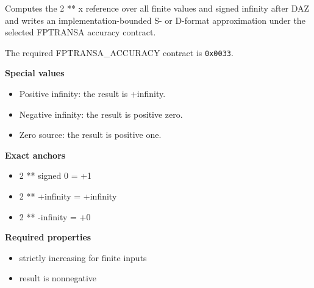 Computes the 2 ** x reference over all finite values and signed infinity after DAZ and writes an implementation-bounded S- or D-format approximation under the selected FPTRANSA accuracy contract.

The required FPTRANSA\_ACCURACY contract is \texttt{0x0033}.

\textbf{Special values}\par
\begin{itemize}
\item Positive infinity: the result is +infinity.
\item Negative infinity: the result is positive zero.
\item Zero source: the result is positive one.
\end{itemize}

\textbf{Exact anchors}\par
\begin{itemize}
\item 2 ** signed 0 = +1
\item 2 ** +infinity = +infinity
\item 2 ** -infinity = +0
\end{itemize}

\textbf{Required properties}\par
\begin{itemize}
\item strictly increasing for finite inputs
\item result is nonnegative
\end{itemize}
